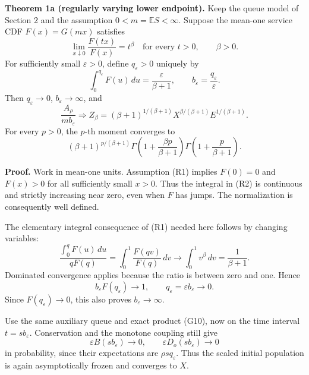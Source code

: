 \documentclass[
  11pt,
  a4paper,
]{scrartcl}
\begin{document}
\textbf{Theorem 1a (regularly varying lower endpoint).} Keep the queue
model of Section 2 and the assumption \(0<m=\mathbb ES<\infty\). Suppose
the mean-one service CDF \(F(x)=G(mx)\) satisfies \[
\lim_{x\downarrow0}\frac{F(tx)}{F(x)}=t^\beta
\quad\text{for every }t>0,\qquad \beta>0. \tag{R1}
\] For sufficiently small \(\varepsilon>0\), define \(q_\varepsilon>0\)
uniquely by \[
\int_0^{q_\varepsilon}F(u)\,du=\frac{\varepsilon}{\beta+1},
\qquad b_\varepsilon=\frac{q_\varepsilon}{\varepsilon}. \tag{R2}
\] Then \(q_\varepsilon\to0\), \(b_\varepsilon\to\infty\), and \[
\frac{A_\rho}{m b_\varepsilon}\Rightarrow
Z_\beta=(\beta+1)^{1/(\beta+1)}
X^{\beta/(\beta+1)}E^{1/(\beta+1)}. \tag{R3}
\] For every \(p>0\), the \(p\)-th moment converges to \[
(\beta+1)^{p/(\beta+1)}
\Gamma\!\left(1+\frac{\beta p}{\beta+1}\right)
\Gamma\!\left(1+\frac{p}{\beta+1}\right). \tag{R4}
\]

\textbf{Proof.} Work in mean-one units. Assumption (R1) implies
\(F(0)=0\) and \(F(x)>0\) for all sufficiently small \(x>0\). Thus the
integral in (R2) is continuous and strictly increasing near zero, even
when \(F\) has jumps. The normalization is consequently well defined.

The elementary integral consequence of (R1) needed here follows by
changing variables: \[
\frac{\int_0^qF(u)\,du}{qF(q)}
=\int_0^1\frac{F(qv)}{F(q)}\,dv
\longrightarrow\int_0^1v^\beta\,dv=\frac1{\beta+1}. \tag{R5}
\] Dominated convergence applies because the ratio is between zero and
one. Hence \[
b_\varepsilon F(q_\varepsilon)\longrightarrow1,
\qquad q_\varepsilon=\varepsilon b_\varepsilon\longrightarrow0. \tag{R6}
\] Since \(F(q_\varepsilon)\to0\), this also proves
\(b_\varepsilon\to\infty\).

Use the same auxiliary queue and exact product (G10), now on the time
interval \(t=s b_\varepsilon\). Conservation and the monotone coupling
still give \[
\varepsilon B(s b_\varepsilon)\to0,\qquad
\varepsilon D_o(s b_\varepsilon)\to0
\] in probability, since their expectations are
\(\rho s q_\varepsilon\). Thus the scaled initial population is again
asymptotically frozen and converges to \(X\).
\end{document}
